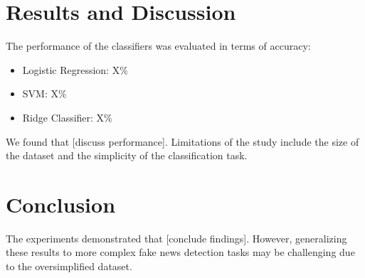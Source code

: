 \documentclass{article}
\begin{document}
\section{Results and Discussion}
The performance of the classifiers was evaluated in terms of accuracy:
\begin{itemize}
    \item Logistic Regression: X\%
    \item SVM: X\%
    \item Ridge Classifier: X\%
\end{itemize}
We found that [discuss performance]. Limitations of the study include the size of the dataset and the simplicity of the classification task.

\section{Conclusion}
The experiments demonstrated that [conclude findings]. However, generalizing these results to more complex fake news detection tasks may be challenging due to the oversimplified dataset.
\end{document}
